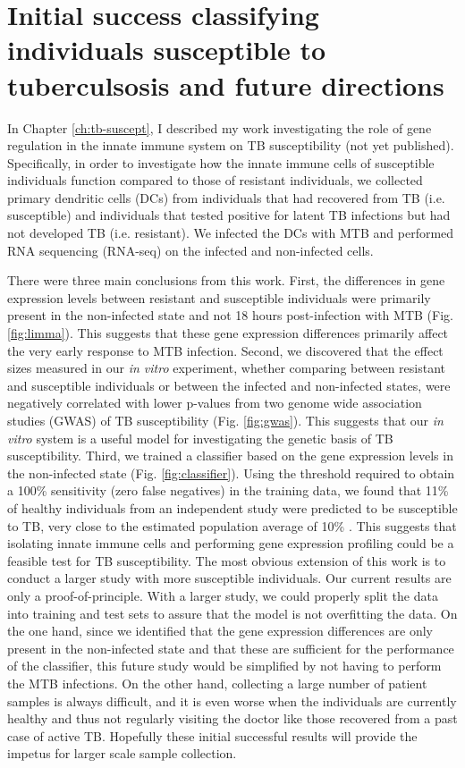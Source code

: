 \section{Initial success classifying individuals susceptible to tuberculsosis and future directions}

In Chapter \ref{ch:tb-suscept}, I described my work investigating the
role of gene regulation in the innate immune system on TB
susceptibility (not yet published). Specifically, in order to
investigate how the innate immune cells of susceptible individuals
function compared to those of resistant individuals, we collected
primary dendritic cells (DCs) from individuals that had recovered from
TB (i.e. susceptible) and individuals that tested positive for latent
TB infections but had not developed TB (i.e. resistant). We infected
the DCs with MTB and performed RNA sequencing (RNA-seq) on the
infected and non-infected cells.

There were three main conclusions from this work. First, the
differences in gene expression levels between resistant and
susceptible individuals were primarily present in the non-infected
state and not 18 hours post-infection with MTB
(Fig. \ref{fig:limma}). This suggests that these gene expression
differences primarily affect the very early response to MTB
infection. Second, we discovered that the effect sizes measured in our
\emph{in vitro} experiment, whether comparing between resistant and
susceptible individuals or between the infected and non-infected
states, were negatively correlated with lower p-values from two genome
wide association studies (GWAS) of TB susceptibility \citep{Thye2010}
(Fig. \ref{fig:gwas}). This suggests that our \emph{in vitro} system
is a useful model for investigating the genetic basis of TB
susceptibility. Third, we trained a classifier based on the gene
expression levels in the non-infected state
(Fig. \ref{fig:classifier}). Using the threshold required to obtain a
100\% sensitivity (zero false negatives) in the training data, we
found that 11\% of healthy individuals from an independent study
\citep{Barreiro2012} were predicted to be susceptible to TB, very
close to the estimated population average of 10\% \citep{North2004,
  OGarra2013}. This suggests that isolating innate immune cells and
performing gene expression profiling could be a feasible test for TB
susceptibility.  The most obvious extension of this work is to conduct
a larger study with more susceptible individuals. Our current results
are only a proof-of-principle. With a larger study, we could properly
split the data into training and test sets to assure that the model is
not overfitting the data. On the one hand, since we identified that
the gene expression differences are only present in the non-infected
state and that these are sufficient for the performance of the
classifier, this future study would be simplified by not having to
perform the MTB infections. On the other hand, collecting a large
number of patient samples is always difficult, and it is even worse
when the individuals are currently healthy and thus not regularly
visiting the doctor like those recovered from a past case of active
TB. Hopefully these initial successful results will provide the
impetus for larger scale sample collection.

